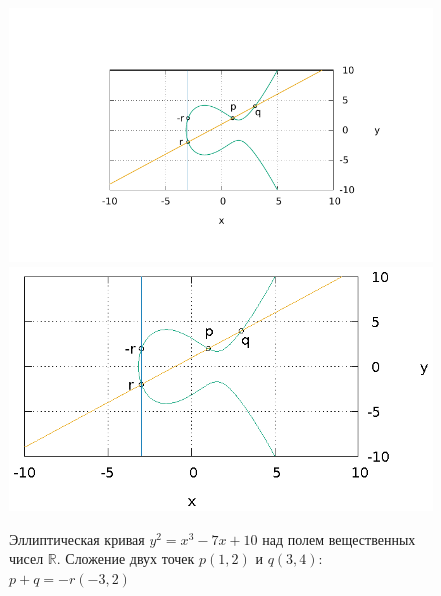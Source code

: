 \begin{figure}
\centering
\ifpdf
\includegraphics[angle=0,scale=1.5]
{./add/discretmath/picellipticsum.pdf}
\else
\includegraphics[angle=0,scale=1.5]
{./add/discretmath/picellipticsum.eps}
\fi
\caption{Эллиптическая кривая $y^2 = x^3 -7 x + 10$ над полем
  вещественных чисел $\mathbb{R}$. Сложение двух точек $p(1,2)$ и
  $q(3,4)$: $p + q = -r(-3,2)$}
\label{fig:add:ellipticRsum}
\end{figure}
